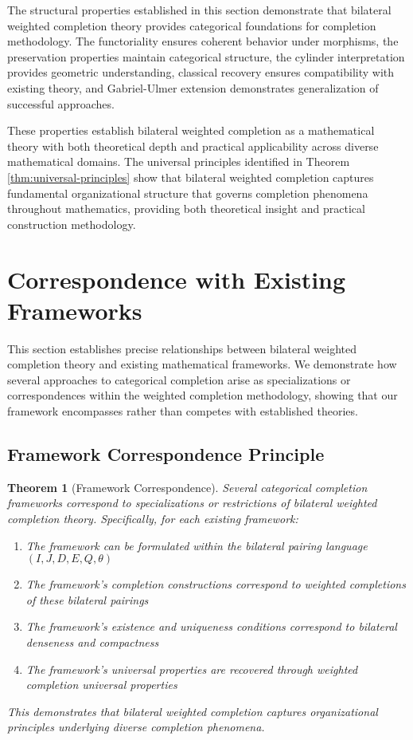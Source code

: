 \documentclass[11pt]{article}
\theoremstyle{plain}
\newtheorem{theorem}{Theorem}[section]
\theoremstyle{definition}
\theoremstyle{remark}
\begin{document}
The structural properties established in this section demonstrate that bilateral weighted completion theory provides categorical foundations for completion methodology. The functoriality ensures coherent behavior under morphisms, the preservation properties maintain categorical structure, the cylinder interpretation provides geometric understanding, classical recovery ensures compatibility with existing theory, and Gabriel-Ulmer extension demonstrates generalization of successful approaches.

These properties establish bilateral weighted completion as a mathematical theory with both theoretical depth and practical applicability across diverse mathematical domains. The universal principles identified in Theorem \ref{thm:universal-principles} show that bilateral weighted completion captures fundamental organizational structure that governs completion phenomena throughout mathematics, providing both theoretical insight and practical construction methodology.

\section{Correspondence with Existing Frameworks}

This section establishes precise relationships between bilateral weighted completion theory and existing mathematical frameworks. We demonstrate how several approaches to categorical completion arise as specializations or correspondences within the weighted completion methodology, showing that our framework encompasses rather than competes with established theories.

\subsection{Framework Correspondence Principle}

\begin{theorem}[Framework Correspondence]\label{thm:framework-unification}
Several categorical completion frameworks correspond to specializations or restrictions of bilateral weighted completion theory. Specifically, for each existing framework:

\begin{enumerate}
\item The framework can be formulated within the bilateral pairing language $(I, J, D, E, Q, \theta)$
\item The framework's completion constructions correspond to weighted completions of these bilateral pairings
\item The framework's existence and uniqueness conditions correspond to bilateral denseness and compactness
\item The framework's universal properties are recovered through weighted completion universal properties
\end{enumerate}

This demonstrates that bilateral weighted completion captures organizational principles underlying diverse completion phenomena.
\end{theorem}
\end{document}
